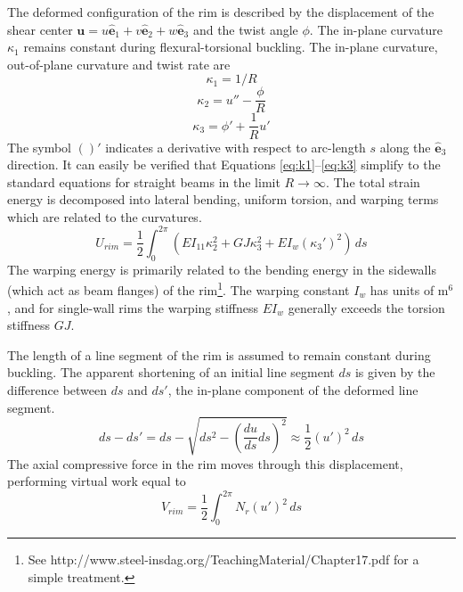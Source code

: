 \documentclass{bmd2016p}
\newcommand{\e}{\ensuremath{\hat{\bm{e}}_1}}
\newcommand{\ee}{\ensuremath{\hat{\bm{e}}_2}}
\newcommand{\eee}{\ensuremath{\hat{\bm{e}}_3}}
\begin{document}
The deformed configuration of the rim is described by the displacement of the shear center $\bm{u}=u\e + v\ee + w\eee$ and the twist angle $\phi$. The in-plane curvature $\kappa_1$ remains constant during flexural-torsional buckling. The in-plane curvature, out-of-plane curvature and twist rate are
	\begin{equation}\label{eq:k1}
	\kappa_1 = 1/R
	\end{equation}
	\begin{equation}\label{eq:k2}
	\kappa_2 = u'' - \frac{\phi}{R}
	\end{equation}
	\begin{equation}\label{eq:k3}
	\kappa_3 = \phi' + \frac{1}{R} u'
	\end{equation}
The symbol $()'$ indicates a derivative with respect to arc-length $s$ along the \eee{} direction. It can easily be verified that Equations \ref{eq:k1}--\ref{eq:k3} simplify to the standard equations for straight beams in the limit $R\rightarrow \infty$. The total strain energy is decomposed into lateral bending, uniform torsion, and warping terms which are related to the curvatures.
	\begin{equation}\label{eq:Urim}
	U_{rim} = \frac{1}{2} \int_0^{2\pi} \left( EI_{11} \kappa_2^2 + GJ \kappa_3^2 + EI_w (\kappa_3')^2 \right)\, ds
	\end{equation}
The warping energy is primarily related to the bending energy in the sidewalls (which act as beam flanges) of the rim\footnote{See http://www.steel-insdag.org/TeachingMaterial/Chapter17.pdf for a simple treatment.}. The warping constant $I_w$ has units of m$^6$, and for single-wall rims the warping stiffness $EI_w$ generally exceeds the torsion stiffness $GJ$.

The length of a line segment of the rim is assumed to remain constant during buckling. The apparent shortening of an initial line segment $ds$ is given by the difference between $ds$ and $ds'$, the in-plane component of the deformed line segment.
	\begin{equation}\label{eq:ds}
	ds - ds' = ds - \sqrt{ds^2 - \left(\frac{du}{ds}ds\right)^2} \approx \frac{1}{2} (u')^2 \, ds
	\end{equation}
The axial compressive force in the rim moves through this displacement, performing virtual work equal to
	\begin{equation}\label{eq:Vrim}
	V_{rim} = \frac{1}{2} \int_0^{2\pi} N_r (u')^2 \, ds
	\end{equation}
\end{document}
